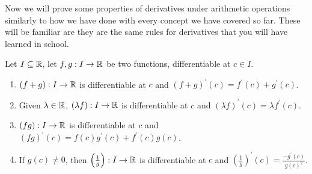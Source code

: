 \documentclass[../real_analysis.tex]{subfiles}
\begin{document}
        Now we will prove some properties of derivatives under arithmetic operations similarly to how we have done with every concept we have covered so far. These will be familiar are they are the same rules for derivatives that you will have learned in school.
        \begin{theorem}\label{diff-func-props}
            Let $I\subseteq\mathbb{R}$, let $f,g:I\to\mathbb{R}$ be two functions, differentiable at $c\in I$.
            \begin{enumerate}[\upshape(i)]
                \item $(f+g):I\to\mathbb{R}$ is differentiable at $c$ and $(f+g)^\prime(c)=f^\prime(c)+g^\prime(c)$.
                \item Given $\lambda\in\mathbb{R}$, $(\lambda f):I\to\mathbb{R}$ is differentiable at $c$ and $(\lambda f)^\prime(c)=\lambda f^\prime(c)$.
                \item $(fg):I\to\mathbb{R}$ is differentiable at $c$ and $(fg)^\prime(c)=f(c)g^\prime(c)+f^\prime(c)g(c)$.
                \item If $g(c)\neq0$, then $\left(\frac{1}{g}\right):I\to\mathbb{R}$ is differentiable at $c$ and $\left(\frac{1}{g}\right)^\prime(c)=\frac{-g^\prime(c)}{g(c)^2}$.
            \end{enumerate}
        \end{theorem}
\end{document}
